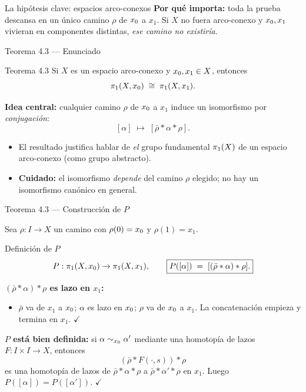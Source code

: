 \begin{frame}{La hipótesis clave: espacios arco-conexos}
  \smallskip
  {\footnotesize \textbf{Por qué importa:} toda la prueba descansa en un único
  camino $\rho$ de $x_0$ a $x_1$. Si $X$ no fuera arco-conexo y $x_0, x_1$
  vivieran en componentes distintas, \emph{ese camino no existiría}.}

\end{frame}

\begin{frame}{Teorema 4.3 — Enunciado}

  \begin{block}{Teorema 4.3}
    Si $X$ es un espacio arco-conexo y $x_0, x_1 \in X$, entonces
    \[
      \pi_1(X, x_0) \;\cong\; \pi_1(X, x_1).
    \]
  \end{block}

  \bigskip
  \textbf{Idea central:} cualquier camino $\rho$ de $x_0$ a $x_1$ induce
  un isomorfismo por \emph{conjugación}:
  \[
    [\alpha] \;\longmapsto\; [\bar{\rho} * \alpha * \rho].
  \]

  \bigskip
  \begin{itemize}
    \item El resultado justifica hablar de \emph{el} grupo fundamental
          $\pi_1(X)$ de un espacio arco-conexo (como grupo abstracto).
    \item \textbf{Cuidado:} el isomorfismo \emph{depende} del camino $\rho$
          elegido; no hay un isomorfismo canónico en general.
  \end{itemize}

\end{frame}

\begin{frame}{Teorema 4.3 — Construcción de $P$}

  Sea $\rho : I \to X$ un camino con $\rho(0) = x_0$ y $\rho(1) = x_1$.

  \medskip
  \begin{block}{Definición de $P$}
    \[
      P : \pi_1(X,x_0) \to \pi_1(X,x_1),
      \qquad
      \boxed{P([\alpha]) \;=\; [(\bar{\rho} * \alpha) * \rho].}
    \]
  \end{block}

  \medskip
  \textbf{$(\bar{\rho} * \alpha) * \rho$ es lazo en $x_1$:}
  \begin{itemize}
    \item $\bar{\rho}$ va de $x_1$ a $x_0$; $\alpha$ es lazo en $x_0$;
          $\rho$ va de $x_0$ a $x_1$. La concatenación empieza y
          termina en $x_1$. \hfill $\checkmark$
  \end{itemize}

  \medskip
  \textbf{$P$ está bien definida:} si $\alpha \sim_{x_0} \alpha'$ mediante
  una homotopía de lazos $F : I \times I \to X$, entonces
  \[
    (\bar{\rho} * F(\cdot, s)) * \rho
  \]
  es una homotopía de lazos de $\bar{\rho} * \alpha * \rho$ a
  $\bar{\rho} * \alpha' * \rho$ en $x_1$. Luego $P([\alpha]) = P([\alpha'])$.
  \hfill $\checkmark$

\end{frame}


